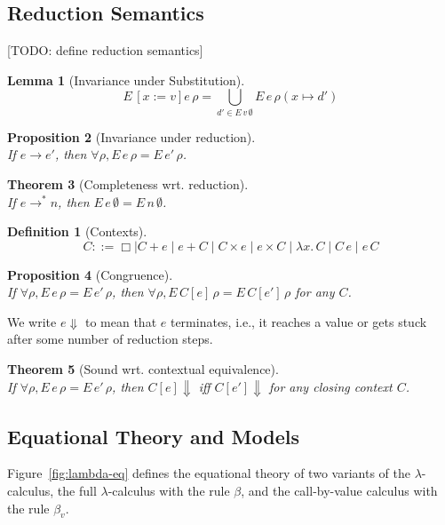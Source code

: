 \documentclass{tufte-handout}
\newcommand{\LAM}[1]{\lambda #1.\,}
\newcommand{\APP}[0]{\,}
\newcommand{\by}[0]{\!:=\!}
\newcommand{\ext}[3]{#3(#1{\mapsto}#2)}
\newtheorem{theorem}{Theorem}%
\newtheorem{lemma}[theorem]{Lemma}
\newtheorem{proposition}[theorem]{Proposition}
\newtheorem{definition}{Definition}%
\begin{document}
\subsection{Reduction Semantics}


[TODO: define reduction semantics]


\begin{lemma}[Invariance under Substitution]
\[
  E\,[x\by v]e\,\rho = \bigcup_{d' \in E\,v\,\emptyset} E\,e\,\ext{x}{d'}{\rho}
\]
\end{lemma}

\begin{proposition}[Invariance under reduction]\ \\
\noindent If $e \longrightarrow e'$, then $\forall \rho, E\,e\,\rho =
E\,e'\,\rho$.
\end{proposition}

\begin{theorem}[Completeness wrt. reduction]\ \\
\noindent If $e \longrightarrow^{*} n$, then $E\,e\,\emptyset =
E\,n\,\emptyset$.
\end{theorem}

\begin{definition}[Contexts]
\[
  C ::= \Box \mid C + e \mid e + C \mid C \times e \mid e \times C \mid
       \LAM{x} C \mid C \APP e \mid e \APP C
\]
\end{definition}

\begin{proposition}[Congruence]\ \\
  If $\forall \rho, E\,e\,\rho = E\,e'\,\rho$, 
  then $\forall \rho, E\,C[e]\,\rho = E\,C[e']\,\rho$
  for any $C$.
\end{proposition}

We write $e\Downarrow$ to mean that $e$ terminates, i.e., it reaches a
value or gets stuck after some number of reduction steps.

\begin{theorem}[Sound wrt. contextual equivalence]\ \\
  If $\forall \rho, E\,e\,\rho = E\,e'\,\rho$, 
  then $C[e]\Downarrow$ iff $C[e']\Downarrow$ for any closing
  context $C$.
\end{theorem}


\subsection{Equational Theory and Models}

Figure~\ref{fig:lambda-eq} defines the equational theory of two
variants of the $\lambda$-calculus, the full $\lambda$-calculus with
the rule $\beta$, and the call-by-value calculus with the rule
$\beta_v.$
\end{document}
